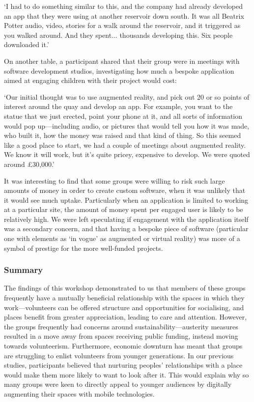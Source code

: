 \begin{displayquote}
`I had to do something similar to this, and the company had already developed an app that they were using at another reservoir down south. It was all Beatrix Potter audio, video, stories for a walk around the reservoir, and it triggered as you walked around. And they spent... thousands developing this. Six people downloaded it.'
\end{displayquote}

On another table, a participant shared that their group were in meetings with software development studios, investigating how much a bespoke application aimed at engaging children with their project would cost:

\begin{displayquote}
`Our initial thought was to use augmented reality, and pick out 20 or so points of interest around the quay and develop an app. For example, you want to the statue that we just erected, point your phone at it, and all sorts of information would pop up---including audio, or pictures that would tell you how it was made, who built it, how the money was raised and that kind of thing. So this seemed like a good place to start, we had a couple of meetings about augmented reality. We know it will work, but it's quite pricey, expensive to develop. We were quoted around £30,000.'
\end{displayquote}

It was interesting to find that some groups were willing to risk such large amounts of money in order to create custom software, when it was unlikely that it would see much uptake. Particularly when an application is limited to working at a particular site, the amount of money spent per engaged user is likely to be relatively high. We were left speculating if engagement with the application itself was a secondary concern, and that having a bespoke piece of software (particular one with elements as `in vogue' as augmented or virtual reality) was more of a symbol of prestige for the more well-funded projects.

\subsubsection{Summary}
The findings of this workshop demonstrated to us that members of these groups frequently have a mutually beneficial relationship with the spaces in which they work---volunteers can be offered structure and opportunities for socialising, and places benefit from greater appreciation, leading to care and attention. However, the groups frequently had concerns around sustainability---austerity measures resulted in a move away from spaces receiving public funding, instead moving towards volunteerism. Furthermore, economic downturn has meant that groups are struggling to enlist volunteers from younger generations. In our previous studies, participants believed that nurturing peoples' relationships with a place would make them more likely to want to look after it. This would explain why so many groups were keen to directly appeal to younger audiences by digitally augmenting their spaces with mobile technologies. 

